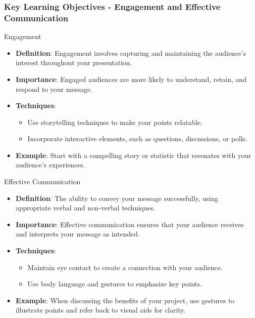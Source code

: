 \documentclass[aspectratio=169]{beamer}
\begin{document}
\begin{frame}[fragile]
    \frametitle{Key Learning Objectives - Engagement and Effective Communication}
    \begin{block}{Engagement}
        \begin{itemize}
            \item \textbf{Definition}: Engagement involves capturing and maintaining the audience's interest throughout your presentation.
            \item \textbf{Importance}: Engaged audiences are more likely to understand, retain, and respond to your message.
            \item \textbf{Techniques}:
            \begin{itemize}
                \item Use storytelling techniques to make your points relatable.
                \item Incorporate interactive elements, such as questions, discussions, or polls.
            \end{itemize}
            \item \textbf{Example}: Start with a compelling story or statistic that resonates with your audience's experiences.
        \end{itemize}
    \end{block}
    
    \begin{block}{Effective Communication}
        \begin{itemize}
            \item \textbf{Definition}: The ability to convey your message successfully, using appropriate verbal and non-verbal techniques.
            \item \textbf{Importance}: Effective communication ensures that your audience receives and interprets your message as intended.
            \item \textbf{Techniques}:
            \begin{itemize}
                \item Maintain eye contact to create a connection with your audience.
                \item Use body language and gestures to emphasize key points.
            \end{itemize}
            \item \textbf{Example}: When discussing the benefits of your project, use gestures to illustrate points and refer back to visual aids for clarity.
        \end{itemize}
    \end{block}
\end{frame}
\end{document}

